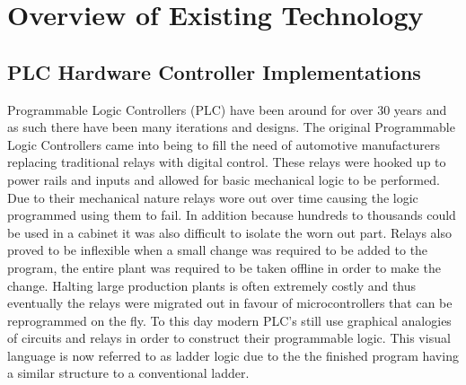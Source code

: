 
\chapter{Overview of Existing Technology}
\section{PLC Hardware Controller Implementations}
Programmable Logic Controllers (PLC) have been around for over 30 years and as such there have been many iterations and designs. The original Programmable Logic Controllers came into being to fill the need of automotive manufacturers replacing traditional relays with digital control. These relays were hooked up to power rails and inputs and allowed for basic mechanical logic to be performed. Due to their mechanical nature relays wore out over time causing the logic programmed using them to fail. In addition because hundreds to thousands could be used in a cabinet it was also difficult to isolate the worn out part. Relays also proved to be inflexible when a small change was required to be added to the program, the entire plant was required to be taken offline in order to make the change. Halting large production plants is often extremely costly and thus eventually the relays were migrated out in favour of microcontrollers that can be reprogrammed on the fly. To this day modern PLC's still use graphical analogies of circuits and relays in order to construct their programmable logic. This visual language is now referred to as ladder logic due to the the finished program having a similar structure to a conventional ladder. 

